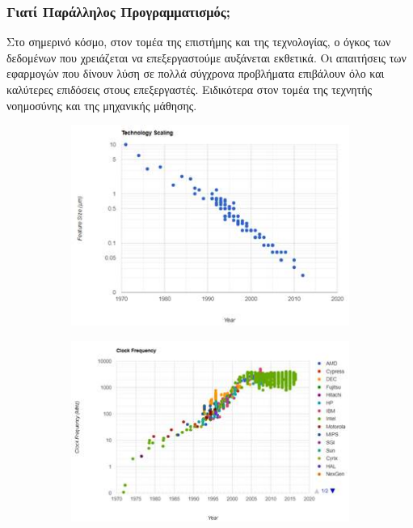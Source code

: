 \subsubsection{Γιατί Παράλληλος Προγραμματισμός;}

Στο σημερινό κόσμο, στον τομέα της επιστήμης και της τεχνολογίας,  ο όγκος των δεδομένων που χρειάζεται να επεξεργαστούμε αυξάνεται εκθετικά. Οι απαιτήσεις των εφαρμογών που δίνουν λύση σε πολλά σύγχρονα προβλήματα  επιβάλουν όλο και καλύτερες επιδόσεις στους επεξεργαστές. Ειδικότερα στον τομέα της τεχνητής νοημοσύνης και της μηχανικής μάθησης.

\begin{figure}[h!]
    \centering
    \begin{subfigure}[b]{0.48\textwidth}
        \centering
        \includegraphics[width=\textwidth]{images/Ch3/technology-scaling.jpg}
    \end{subfigure}
    \hfill
    \begin{subfigure}[b]{0.48\textwidth}
        \centering
        \includegraphics[width=\textwidth]{images/Ch3/clock-frequency.jpg}
    \end{subfigure}
    \caption{\cite{cpudb}}
    \label{fig:scaling-clock}
\end{figure}
 
